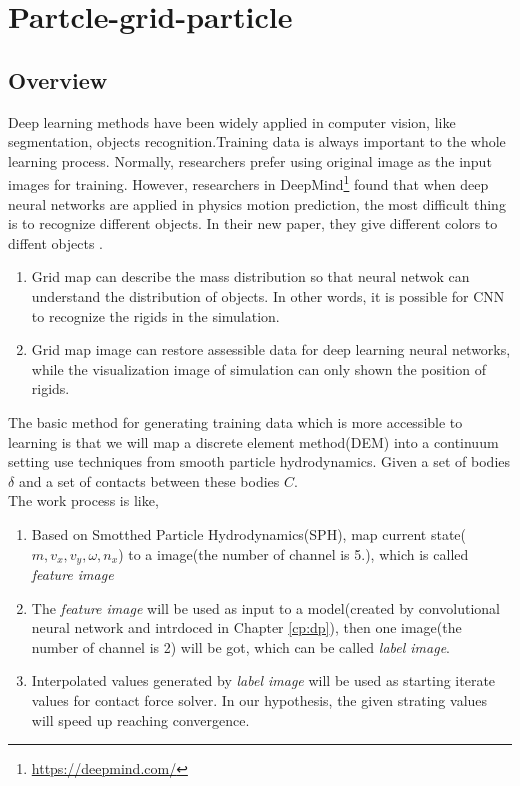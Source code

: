 \chapter{Partcle-grid-particle}
\section{Overview}
    Deep learning methods have been widely applied in computer vision, like segmentation, objects recognition.Training data is always important to the whole learning process. Normally, researchers prefer using original image as the input images for training. However, researchers in DeepMind\footnote{\url{https://deepmind.com/}} found that when deep neural networks are applied in physics motion prediction, the most difficult thing is to recognize different objects. In their new paper, they give different colors to diffent objects \cite{DBLP:journals/corr/WattersTWPBZ17}.  \\

    \begin{enumerate}
        \item Grid map can describe the mass distribution so that neural netwok can understand the distribution of objects. In other words, it is possible for CNN to recognize the rigids in the simulation.
        \item Grid map image can restore assessible data for deep learning neural networks, while the visualization image of simulation can only shown the position of rigids.
    \end{enumerate}

    The basic method for generating training data which is more accessible to learning is that we will map a discrete element method(DEM) into a continuum setting use techniques from smooth particle hydrodynamics. Given a set of bodies $\delta$ and a set of contacts between these bodies $C$. \\
    The work process is like,
    \begin{enumerate}
        \item Based on Smotthed Particle Hydrodynamics(SPH), map current state($m, v_x, v_y, \omega, n_x$) to a image(the number of channel is 5.), which is called \textit{feature image}
        \item The \textit{feature image} will be used as input to a model(created by convolutional neural network and intrdoced in Chapter \ref{cp:dp}), then one image(the number of channel is 2) will be got, which can be called \textit{label image}.
        \item Interpolated values generated by \textit{label image} will be used as starting iterate values for contact force solver. In our hypothesis, the given strating values will speed up reaching convergence.
    \end{enumerate}

